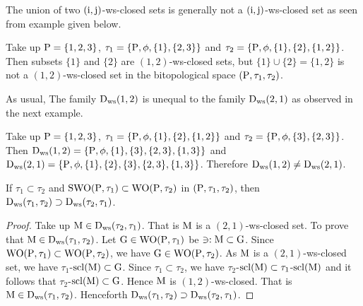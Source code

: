 \begin{rem}\label{rem8.2.4}
The union of two $(\mathrm{i}, \mathrm{j})$-ws-closed sets is generally not a $(\mathrm{i}, \mathrm{j})$-ws-closed set as seen from example given below.
\end{rem}

\begin{exm}\label{exm8.2.12}
Take up $\mathrm{P}=\{1,2,3\}$, $\tau_1 =\{\mathrm{P}, \phi, \{1\},\{2, 3\}\}$ and $\tau_2 =\{\TSP, \phi, \{1\},\break \{2\}, \{1, 2\}\}$. Then subsets $\{1\}$ and $\{2\}$ are $(1, 2)$-ws-closed sets, but $\{1\}\cup \{2\}=\{1,2\}$ is not a $(1, 2)$-ws-closed set in the bitopological space $(\mathrm{P}, \tau_1, \tau_2 )$.
\end{exm}

\begin{rem}\label{rem8.2.5} 
As usual, The family $\mathrm{D}_{\mathrm{ws}} (1, 2)$ is unequal to the family $\mathrm{D}_{\mathrm{ws}} (2, 1)$ as observed in the next example.
\end{rem}

\begin{exm}\label{exm8.2.13}
Take up $\mathrm{P}= \{1,2,3\}$, $\tau_1 =\{\mathrm{P}, \phi, \{1\}, \{2\}, \{1, 2\}\}$ and $\tau_2 =\{\mathrm{P}, \phi, \{3\}, \{2, 3\}\}$. Then $\mathrm{D}_{\mathrm{ws}}(1, 2)=\{\mathrm{P}, \phi, \{1\}, \{3\},\{2,3\},\{1,3\}\}$ and $\mathrm{D}_{\mathrm{ws}} (2, 1)=\{\mathrm{P}, \phi, \{1\}, \{2\}, \{3\},\{2, 3\}, \{1,3\}\}$. Therefore $\mathrm{D}_{\mathrm{ws}} (1, 2)\neq \mathrm{D}_{\mathrm{ws}} (2, 1)$.
\end{exm}

\begin{thm}\label{thm8.2.11}
If $\tau_1 \subset \tau_2$ and $\mathrm{SWO}(\mathrm{P}, \tau_1) \subset \mathrm{WO}(\mathrm{P}, \tau_2 )$ in $(\mathrm{P}, \tau_1, \tau_2 )$, then $\mathrm{D}_{\mathrm{ws}} (\tau_1, \tau_2 ) \supset  \mathrm{D}_{\mathrm{ws}} (\tau_2,\tau_1 )$.
\end{thm}

\begin{proof}
Take up $\mathrm{M}\in \mathrm{D}_{\mathrm{ws}} (\tau_2, \tau_1 )$. That is $\mathrm{M}$ is a $(2, 1)$-ws-closed set. To prove that $\mathrm{M}\in \mathrm{D}_{\mathrm{ws}} (\tau_1,\tau_2 )$. Let $\mathrm{G}\in \mathrm{WO}(\mathrm{P}, \tau_1 )$ be $\ni: \mathrm{M} \subset \mathrm{G}$. Since $\mathrm{WO}(\mathrm{P}, \tau_1 ) \subset \mathrm{WO}(\mathrm{P}, \tau_2 )$, we have $\mathrm{G}\in \mathrm{WO}(\mathrm{P}, \tau_2 )$. As $\mathrm{M}$ is a $(2, 1)$-ws-closed set, we have $\tau_1$-$\mathrm{scl}(\mathrm{M}) \subset \mathrm{G}$. Since $\tau_1 \subset \tau_2$, we have $\tau_2$-$\mathrm{scl}(\mathrm{M}) \subset \tau_1$-$\mathrm{scl}(\mathrm{M})$ and it follows that $\tau_2$-$\mathrm{scl}(\mathrm{M}) \subset \mathrm{G}$. Hence $\mathrm{M}$ is $(1, 2)$-ws-closed. That is $\mathrm{M} \in \mathrm{D}_{\mathrm{ws}} (\tau_1, \tau_2 )$. Henceforth $\mathrm{D}_{\mathrm{ws}} (\tau_1, \tau_2 ) \supset  \mathrm{D}_{\mathrm{ws}} (\tau_2, \tau_1 )$.
\end{proof}

